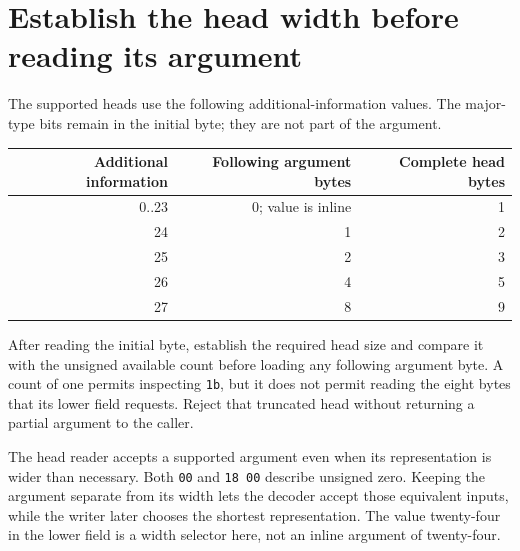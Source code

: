\section{Establish the head width before reading its argument}
The supported heads use the following additional-information values. The major-type
bits remain in the initial byte; they are not part of the argument.

\begin{center}
  \begin{tabular}{rrr}
    Additional information & Following argument bytes & Complete head bytes \\
    \hline
    0..23                  & 0; value is inline       & 1                   \\
    24                     & 1                        & 2                   \\
    25                     & 2                        & 3                   \\
    26                     & 4                        & 5                   \\
    27                     & 8                        & 9                   \\
  \end{tabular}
\end{center}

After reading the initial byte, establish the required head size and compare it with
the unsigned available count before loading any following argument byte. A count of
one permits inspecting \texttt{1b}, but it does not permit reading the eight bytes that
its lower field requests. Reject that truncated head without returning a partial
argument to the caller.

The head reader accepts a supported argument even when its representation is wider
than necessary. Both \texttt{00} and \texttt{18 00} describe unsigned zero. Keeping the
argument separate from its width lets the decoder accept those equivalent inputs,
while the writer later chooses the shortest representation. The value twenty-four in
the lower field is a width selector here, not an inline argument of twenty-four.

